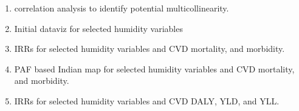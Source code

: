\documentclass[
  letterpaper,
  DIV=11,
  numbers=noendperiod]{scrartcl}
\begin{document}
\begin{tcolorbox}[enhanced jigsaw, coltitle=black, bottomtitle=1mm, left=2mm, colbacktitle=quarto-callout-note-color!10!white, opacitybacktitle=0.6, opacityback=0, toprule=.15mm, toptitle=1mm, colframe=quarto-callout-note-color-frame, titlerule=0mm, breakable, bottomrule=.15mm, colback=white, title=\textcolor{quarto-callout-note-color}{\faInfo}\hspace{0.5em}{✅ Completed}, leftrule=.75mm, rightrule=.15mm, arc=.35mm]

\begin{enumerate}
\def\labelenumi{\arabic{enumi}.}
\item
  correlation analysis to identify potential multicollinearity.
\item
  Initial dataviz for selected humidity variables
\item
  IRRs for selected humidity variables and CVD mortality, and morbidity.
\item
  PAF based Indian map for selected humidity variables and CVD
  mortality, and morbidity.
\item
  IRRs for selected humidity variables and CVD DALY, YLD, and YLL.
\end{enumerate}

\end{tcolorbox}
\end{document}
